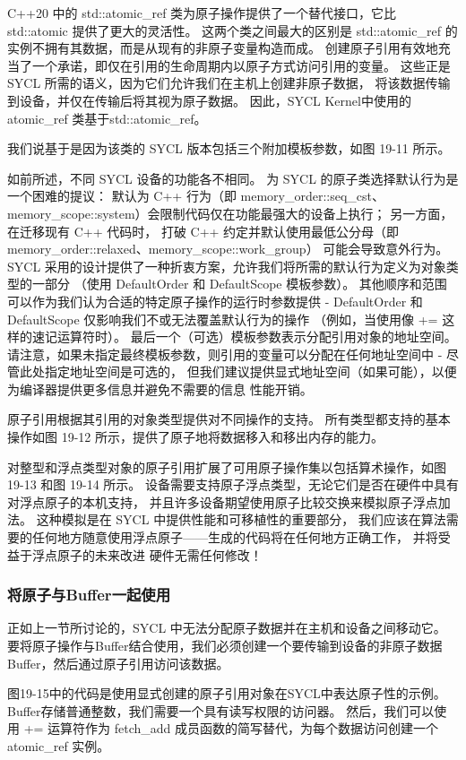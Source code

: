 C++20 中的 std::atomic\_ref 类为原子操作提供了一个替代接口，它比 std::atomic 提供了更大的灵活性。 
这两个类之间最大的区别是 std::atomic\_ref 的实例不拥有其数据，而是从现有的非原子变量构造而成。 
创建原子引用有效地充当了一个承诺，即仅在引用的生命周期内以原子方式访问引用的变量。 
这些正是 SYCL 所需的语义，因为它们允许我们在主机上创建非原子数据，
将该数据传输到设备，并仅在传输后将其视为原子数据。 
因此，SYCL Kernel中使用的atomic\_ref 类基于std::atomic\_ref。

我们说基于是因为该类的 SYCL 版本包括三个附加模板参数，如图 19-11 所示。

如前所述，不同 SYCL 设备的功能各不相同。 
为 SYCL 的原子类选择默认行为是一个困难的提议：
默认为 C++ 行为（即 memory\_order::seq\_cst、memory\_scope::system）会限制代码仅在功能最强大的设备上执行； 
另一方面，在迁移现有 C++ 代码时，
打破 C++ 约定并默认使用最低公分母（即 memory\_order::relaxed、memory\_scope::work\_group）
可能会导致意外行为。 
SYCL 采用的设计提供了一种折衷方案，允许我们将所需的默认行为定义为对象类型的一部分
（使用 DefaultOrder 和 DefaultScope 模板参数）。 
其他顺序和范围可以作为我们认为合适的特定原子操作的运行时参数提供
 - DefaultOrder 和 DefaultScope 仅影响我们不或无法覆盖默认行为的操作
 （例如，当使用像 += 这样的速记运算符时）。 最后一个（可选）模板参数表示分配引用对象的地址空间。 
 请注意，如果未指定最终模板参数，则引用的变量可以分配在任何地址空间中 - 尽管此处指定地址空间是可选的，
 但我们建议提供显式地址空间（如果可能），以便为编译器提供更多信息并避免不需要的信息 性能开销。

原子引用根据其引用的对象类型提供对不同操作的支持。 
所有类型都支持的基本操作如图 19-12 所示，提供了原子地将数据移入和移出内存的能力。

对整型和浮点类型对象的原子引用扩展了可用原子操作集以包括算术操作，如图 19-13 和图 19-14 所示。 
设备需要支持原子浮点类型，无论它们是否在硬件中具有对浮点原子的本机支持，
并且许多设备期望使用原子比较交换来模拟原子浮点加法。 
这种模拟是在 SYCL 中提供性能和可移植性的重要部分，
我们应该在算法需要的任何地方随意使用浮点原子——生成的代码将在任何地方正确工作，
并将受益于浮点原子的未来改进 硬件无需任何修改！

\subsubsection{将原子与Buffer一起使用}
正如上一节所讨论的，SYCL 中无法分配原子数据并在主机和设备之间移动它。 
要将原子操作与Buffer结合使用，我们必须创建一个要传输到设备的非原子数据Buffer，然后通过原子引用访问该数据。

图19-15中的代码是使用显式创建的原子引用对象在SYCL中表达原子性的示例。 
Buffer存储普通整数，我们需要一个具有读写权限的访问器。 
然后，我们可以使用 += 运算符作为 fetch\_add 成员函数的简写替代，为每个数据访问创建一个atomic\_ref 实例。

